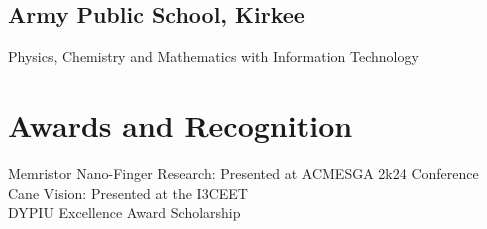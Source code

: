 \documentclass[]{plushcv}
\begin{document}
\begin{minipage}[t]{0.25\textwidth}
\subsection{Army Public School, Kirkee}
Physics, Chemistry and Mathematics with Information Technology \\

\sectionsep


\section{Awards and Recognition} 
\textbullet{}Memristor Nano-Finger Research: Presented at ACMESGA 2k24 Conference\\
\textbullet{}Cane Vision: Presented at the I3CEET\\
\textbullet{}DYPIU Excellence Award Scholarship \\







\end{minipage} 
\end{document}
